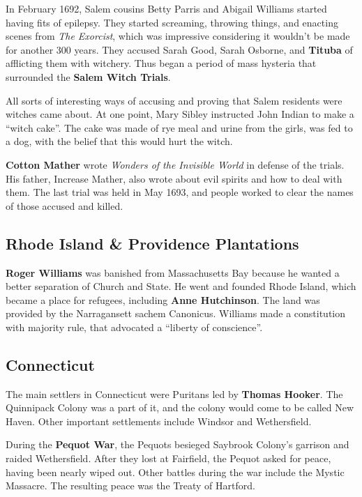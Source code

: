 In February 1692, Salem cousins Betty Parris and Abigail Williams started having fits of epilepsy.
They started screaming, throwing things, and enacting scenes from \textit{The Exorcist},
which was impressive considering it wouldn't be made for another 300 years.
They accused Sarah Good, Sarah Osborne, and \textbf{Tituba} of afflicting them with witchery.
Thus began a period of mass hysteria that surrounded the \textbf{Salem Witch Trials}.

All sorts of interesting ways of accusing and proving that Salem residents were witches came about.
At one point, Mary Sibley instructed John Indian to make a ``witch cake''.
The cake was made of rye meal and urine from the girls, was fed to a dog,
with the belief that this would hurt the witch.

\textbf{Cotton Mather} wrote \textit{Wonders of the Invisible World} in defense of the trials.
His father, Increase Mather, also wrote about evil spirits and how to deal with them.
The last trial was held in May 1693, and people worked to clear the names of those accused and killed.

\subsection*{Rhode Island \& Providence Plantations}

\textbf{Roger Williams}
was banished from Massachusetts Bay because he wanted a better separation of Church and State.
He went and founded Rhode Island, which became a place for refugees,
including \textbf{Anne Hutchinson}.
The land was provided by the Narragansett sachem Canonicus.
Williams made a constitution with majority rule, that advocated a ``liberty of conscience''.

\subsection*{Connecticut}

The main settlers in Connecticut were Puritans led by \textbf{Thomas Hooker}.
The Quinnipack Colony was a part of it, and the colony would come to be called New Haven.
Other important settlements include Windsor and Wethersfield.

During the \textbf{Pequot War},
the Pequots besieged Saybrook Colony's garrison and raided Wethersfield.
After they lost at Fairfield, the Pequot asked for peace, having been nearly wiped out.
Other battles during the war include the Mystic Massacre.
The resulting peace was the Treaty of Hartford.


